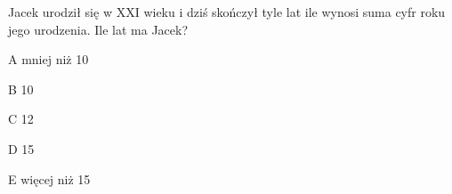\begin{tresc}
Jacek urodził się w XXI wieku i dziś skończył tyle lat ile wynosi suma cyfr roku jego urodzenia. Ile lat ma Jacek?
\end{tresc}
\begin{wariant}{A} mniej niż 10 \end{wariant}
\begin{wariant}{B} 10 \end{wariant}
\begin{wariant}{C} 12 \end{wariant}
\begin{wariant}{D} 15 \end{wariant}
\begin{wariant}{E} więcej niż 15 \end{wariant}
